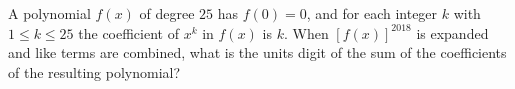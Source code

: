 A polynomial $f(x)$ of degree $25$ has $f(0)=0$, and for each integer $k$ with $1\le k\le25$ the coefficient of $x^k$ in $f(x)$ is $k$. When $[f(x)]^{2018}$ is expanded and like terms are combined, what is the units digit of the sum of the coefficients of the resulting polynomial?
